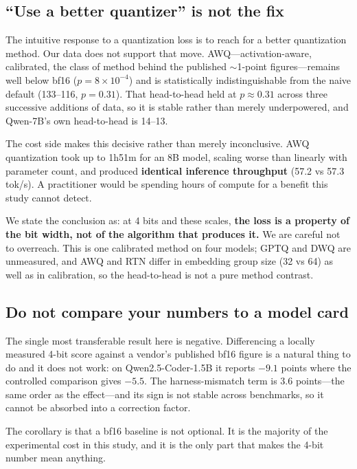 \documentclass[11pt]{article}
\begin{document}
\subsection{``Use a better quantizer'' is not the fix}

The intuitive response to a quantization loss is to reach for a better quantization
method. Our data does not support that move. AWQ---activation-aware, calibrated, the
class of method behind the published ${\sim}$1-point figures---remains well below bf16
($p = 8 \times 10^{-4}$) and is statistically indistinguishable from the naive default
(133--116, $p = 0.31$). That head-to-head held at $p \approx 0.31$ across three
successive additions of data, so it is stable rather than merely underpowered, and
Qwen-7B's own head-to-head is 14--13.

The cost side makes this decisive rather than merely inconclusive. AWQ quantization took
up to 1h51m for an 8B model, scaling worse than linearly with parameter count, and
produced \textbf{identical inference throughput} (57.2 vs 57.3 tok/s). A practitioner
would be spending hours of compute for a benefit this study cannot detect.

We state the conclusion as: at 4 bits and these scales, \textbf{the loss is a property of
the bit width, not of the algorithm that produces it.} We are careful not to overreach.
This is one calibrated method on four models; GPTQ and DWQ are unmeasured, and AWQ and
RTN differ in embedding group size (32 vs 64) as well as in calibration, so the
head-to-head is not a pure method contrast.

\subsection{Do not compare your numbers to a model card}

The single most transferable result here is negative. Differencing a locally measured
4-bit score against a vendor's published bf16 figure is a natural thing to do and it does
not work: on Qwen2.5-Coder-1.5B it reports $-9.1$ points where the controlled comparison
gives $-5.5$. The harness-mismatch term is 3.6 points---the same order as the
effect---and its sign is not stable across benchmarks, so it cannot be absorbed into a
correction factor.

The corollary is that a bf16 baseline is not optional. It is the majority of the
experimental cost in this study, and it is the only part that makes the 4-bit number mean
anything.
\end{document}
